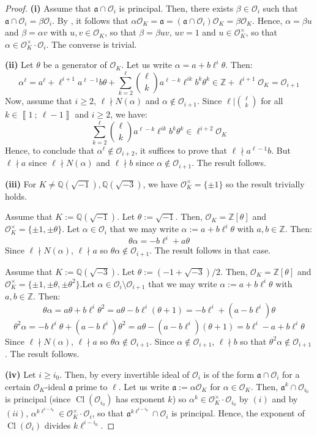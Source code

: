 \documentclass[a4paper,10pt]{report}
\theoremstyle{definition}
\theoremstyle{plain}
\theoremstyle{definition}
\newcommand{\Z}{\mathbb{Z}}
\newcommand{\Q}{\mathbb{Q}}
\newcommand{\mO}{\mathcal{O}}
\renewcommand{\i}[2]{\left\llbracket #1~;~#2\right\rrbracket}
\renewcommand{\(}{\left(}
\renewcommand{\)}{\right)}
\newcommand{\mf}[1]{\mathfrak{#1}}
\DeclareMathOperator{\Cl}{Cl}
\begin{document}
\begin{proof}

\textbf{(i)} Assume that $\mf{a}\cap\mO_i$ is principal. Then, there exists $\beta\in\mO_i$ such that $\mf{a}\cap\mO_i=\beta\mO_i$.  By \cite[proposition 7.20]{Cox}, it follows that $\alpha\mO_K=\mf{a}=(\mf{a}\cap\mO_i)\mO_K=\beta\mO_K$. Hence, $\alpha=\beta u$ and $\beta=\alpha v$ with $u, v\in\mO_K$, so that $\beta=\beta uv$, $uv=1$ and $u\in\mO_K^\times$, so that $\alpha\in\mO_K^\times\cdot \mO_i$. The converse is trivial.

\textbf{(ii)} Let $\theta$ be a generator of $\mO_K$. Let us write $\alpha=a+b\ell^i\theta$.  Then:
\[\alpha^\ell=a^\ell+\ell^{i+1}a^{\ell-1}b\theta+\sum_{k=2}^\ell\binom{\ell}{k}a^{\ell-k}\ell^{ik}b^k\theta^k\in \Z+\ell^{i+1}\mO_K=\mO_{i+1}\]
Now, assume that $i\geq 2$, $\ell\nmid N(\alpha)$ and $\alpha\not\in\mO_{i+1}$. Since $\ell|\binom{\ell}{k}$ for all $k\in\i{1}{\ell-1}$ and $i\geq 2$, we have:
\[\sum_{k=2}^\ell\binom{\ell}{k}a^{\ell-k}\ell^{ik}b^k\theta^k\in\ell^{i+2}\mO_K\]
Hence, to conclude that $\alpha^\ell\not\in\mO_{i+2}$, it suffices to prove that $\ell\nmid a^{\ell-1}b$. But $\ell\nmid a$ since $\ell\nmid N(\alpha)$ and $\ell\nmid b$ since $\alpha\not\in\mO_{i+1}$. The result follows.

\textbf{(iii)} For $K\neq \Q(\sqrt{-1}), \Q(\sqrt{-3})$, we have $\mO_K^\times=\{\pm 1\}$ so the result trivially holds.

Assume that $K:=\Q(\sqrt{-1})$. Let $\theta:=\sqrt{-1}$. Then, $\mO_K=\Z[\theta]$ and $\mO_K^\times=\{\pm 1,\pm\theta\}$.  Let $\alpha\in\mO_{i}$ that we may write $\alpha:=a+b\ell^{i}\theta$ with $a,b\in\Z$. Then:
\[\theta\alpha=-b\ell^{i}+a\theta\]
Since $\ell\nmid N(\alpha)$, $\ell\nmid a$ so $\theta\alpha\not\in\mO_{i+1}$.  The result follows in that case.

Assume that $K:=\Q(\sqrt{-3})$. Let $\theta:=(-1+\sqrt{-3})/2$. Then, $\mO_K=\Z[\theta]$ and $\mO_K^\times=\{\pm 1,\pm\theta,\pm\theta^2\}$.Let $\alpha\in\mO_{i}\setminus\mO_{i+1}$ that we may write $\alpha:=a+b\ell^{i}\theta$ with $a,b\in\Z$. Then:
\[\theta\alpha=a\theta+b\ell^i\theta^2=a\theta-b\ell^i(\theta+1)=-b\ell^i+(a-b\ell^i)\theta\]
\[\theta^2\alpha=-b\ell^i\theta+(a-b\ell^i)\theta^2=a\theta-(a-b\ell^i)(\theta+1)=b\ell^i-a+b\ell^i\theta\]
Since $\ell\nmid N(\alpha)$, $\ell\nmid a$ so $\theta\alpha\not\in\mO_{i+1}$.  Since $\alpha\not\in\mO_{i+1}$, $\ell\nmid b$ so that $\theta^2\alpha\not\in\mO_{i+1}$. The result follows.

\textbf{(iv)} Let $i\geq i_0$. Then, by \cite[proposition 7.20]{Cox} every invertible ideal of $\mO_i$ is of the form  $\mf{a}\cap\mO_i$ for a certain $\mO_K$-ideal $\mf{a}$ prime to $\ell$.  Let us write $\mf{a}:=\alpha\mO_K$ for $\alpha\in\mO_K$. Then, $\mf{a}^k\cap\mO_{i_0}$ is principal (since $\Cl(\mO_{i_0})$ has exponent $k$) so $\alpha^{k}\in\mO_K^\times\cdot \mO_{i_0}$ by $(i)$ and by $(ii)$, $\alpha^{k\ell^{i-i_0}}\in\mO_K^\times\cdot\mO_i$, so that $\mf{a}^{k\ell^{i-i_0}}\cap\mO_i$ is principal. Hence, the exponent of $\Cl(\mO_i)$ divides $k\ell^{i-i_0}$. 


\end{proof}
\end{document}
